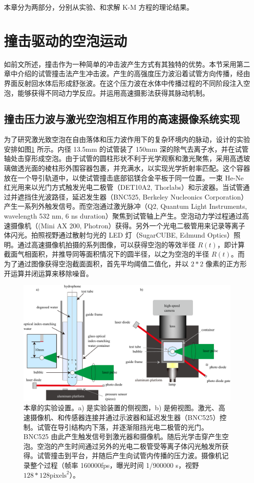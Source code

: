 本章分为两部分，分别从实验、和求解 K-M 方程的理论结果。


\section{撞击驱动的空泡运动}

如前文所述，撞击作为一种简单的冲击波产生方式有其独特的优势。本节采用第二章中介绍的试管撞击法产生冲击波。产生的高强度压力波沿着试管方向传播，经由界面反射回水体后形成舒张波。在这个压力波在水体中传播过程的不同阶段注入空泡，能够获得不同动力学反应。并运用高速摄影法获得其脉动机制。

\subsection{撞击压力波与激光空泡相互作用的高速摄像系统实现}

为了研究激光致空泡在自由落体和压力波作用下的复杂环境内的脉动，设计的实验安排如图\ref{fig:5.2} 所示。内径 13.5mm 的试管装了 150mm
深的除气去离子水，并在试管轴处击穿形成空泡。由于试管的圆柱形状不利于光学观察和激光聚焦，采用高透玻璃做透光面的棱柱形外围容器包裹，并充满水，以实现光学折射率匹配。这个容器放在一个导引轨道中，以使试管撞击底部铝镁合金平板于同一位置。一束
He-Ne 红光用来以光门方式触发光电二极管（DET10A2,
Thorlabs）和示波器。当试管通过并遮挡住光波路径，延迟发生器（BNC525,
Berkeley Nucleonics
Corporation）产生一系列外触发信号。而空泡通过激光脉冲（Q2, Quantum Light
Instruments, wavelength 532 nm, 6 ns
duration）聚焦到试管轴上产生。空泡动力学过程通过高速摄像机（(Mini AX
200,
Photron）获得。另外一个光电二极管用来记录等离子体闪光。拍照视野通过散射匀光的
LED 灯（SugarCUBE, Edmund
Optics）照明。通过高速摄像机拍摄的系列图像，可以获得空泡的等效半径
$R(t)$，即计算截面气相面积，并推导同等面积情况下的圆半径，以之为空泡的半径
$R(t)$。而为了通过图像获得空泡截面面积，首先平均阈值二值化，并以
$2*2$ 像素的正方形开运算并闭运算来移除噪音。

\begin{figure}[H]
  \centering
  \includegraphics[width=0.8\linewidth]{img/fig5.2-eps-converted-to.pdf}
  \caption[本章的实验设置]{本章的实验设置。a)
是实验装置的侧视图，b)
是俯视图。激光、高速摄像机、和传感器连接并通过示波器和延迟发生器（BNC525）控制。试管在导引结构内下落，并逐渐阻挡光电二极管的光门。BNC525
由此产生触发信号到激光器和摄像机。随后光学击穿产生空泡。空泡的产生时间通过另外的光电二极管受等离子体闪光触发所获得。试管撞击到平台，并随后产生向试管内传播的压力波。摄像机记录整个过程（帧率
160000fps，曝光时间 1/900000 s，视野 $128*128\text{pixels}^2$）。}
  \label{fig:5.2}
\end{figure}

